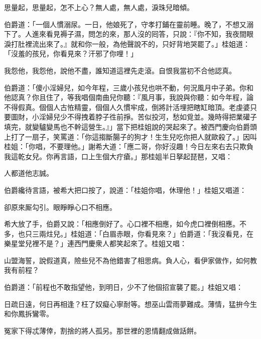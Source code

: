 \begin{myquote} 
思量起，思量起，怎不上心？無人處，無人處，淚珠兒暗傾。
\end{myquote} 

伯爵道：「一個人慣溺尿。一日，他娘死了，守孝打鋪在靈前睡。晚了，不想又溺下了。人進來看見褥子濕，問怎的來，那人沒的囘答，只說：『你不知，我夜間眼淚打肚裡流出來了。』就和你一般，為他聲說不的，只好背地哭罷了。」桂姐道：「沒羞的孩兒，你看見來？汗邪了你哩！」

\begin{myquote}
我怨他，我怨他，說他不盡，誰知道這裡先走滾。自恨我當初不合他認真。
\end{myquote}

伯爵道：「傻小淫婦兒，如今年程，三歲小孩兒也哄不動，何況風月中子弟。你和他認真？你且住了，等我唱個南曲兒你聽：『風月事，我說與你聽：如今年程，論不得假真。個個人古恠精靈，個個人久慣牢成，倒將計活埋把瞎缸暗頂。老虔婆只要圖財，小淫婦兒少不得拽着脖子徃前掙。苦似投河，愁如覓並。幾時得把業礶子填完，就變驢變馬也不幹這營生。』」當下把桂姐說的哭起來了。{}被西門慶向伯爵頭上打了一扇子，笑罵道：「你這搊斷腸子的狗才！生生兒吃你把人就歐殺了。」因叫桂姐：「你唱，不要理他。」謝希大道：「應二哥，你好沒趣！今日左來右去只欺負我這乾女兒。你再言語，口上生個大疔瘡。」那桂姐半日拏起琵琶，又唱：

\begin{myquote}
人都道他志誠。
\end{myquote}

伯爵纔待言語，被希大把口按了，{}說道：「桂姐你唱，休理他！」桂姐又唱道：

\begin{myquote}
卻原來厮勾引。眼睜睜心口不相應。
\end{myquote}

希大放了手，伯爵又說：「相應倒好了。心口裡不相應，如今虎口裡倒相應。不多，也只三兩炷兒。」桂姐道：「白眉赤眼，你看見來？」伯爵道：「我沒看見，在樂星堂兒裡不是？」連西門慶衆人都笑起來了。桂姐又唱：

\begin{myquote}
山盟海誓，說假道真，險些兒不為他錯害了相思病。負人心，看伊家做作，如何教我有前程？
\end{myquote}

伯爵道：「前程也不敢指望他，到明日，少不了他個招宣襲了罷。」桂姐又唱：

\begin{myquote}
日疏日遠，何日再相逢？枉了奴癡心寧耐等。想巫山雲雨夢難成。薄情，猛拚今生和你鳳拆鸞零。

冤家下得忒薄倖，割捨的將人孤另。那世裡的恩情翻成做話餅。
\end{myquote}

